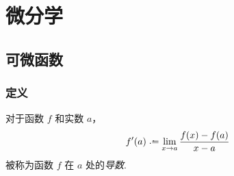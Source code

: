 \section{微分学}
\subsection{可微函数}
\subsubsection{定义}
\begin{definition}
    对于函数 $f$ 和实数 $a$，
    \[f'(a) \defeq \lim_{x \rightarrow a} \frac{f(x)-f(a)}{x-a}\]
    被称为函数 $f$ 在 $a$ 处的\emph{导数}.
\end{definition}